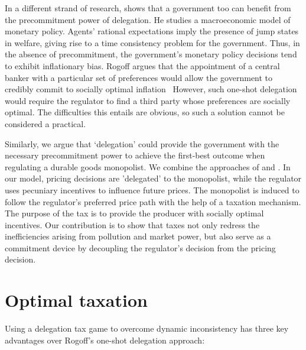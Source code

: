 In a different strand of research, \citet{Rogoff1985} shows that a
government too can benefit from the precommitment power of delegation. He
studies a macroeconomic model of monetary policy. Agents' rational
expectations imply the presence of jump states in welfare, giving rise to a
time consistency problem for the government. Thus, in the absence of
precommitment, the government's monetary policy decisions tend to exhibit
inflationary bias. Rogoff argues that the appointment of a central banker
with a particular set of preferences would allow the government to credibly
commit to socially optimal inflation \ However, such one-shot delegation
would require the regulator to find a third party whose preferences are
socially optimal. The difficulties this entails are obvious, so such a
solution cannot be considered a practical.

Similarly, we argue that `delegation' could provide the government with the
necessary precommitment power to achieve the first-best outcome when
regulating a durable goods monopolist. We combine the approaches of %
\citet{Rogoff1985} and \citet{Sklivas1987}. In our model, pricing decisions
are 'delegated' to the monopolist, while the regulator uses pecuniary
incentives to influence future prices. The monopolist is induced to follow
the regulator's preferred price path with the help of a taxation mechanism.
The purpose of the tax is to provide the producer with socially optimal
incentives. Our contribution is to show that taxes not only redress the
inefficiencies arising from pollution and market power, but also serve as a
commitment device by decoupling the regulator's decision from the pricing
decision.

\section{Optimal taxation}

\label{sec:optimal-taxation}

Using a delegation tax game to overcome dynamic inconsistency has three key
advantages over Rogoff's one-shot delegation approach:

